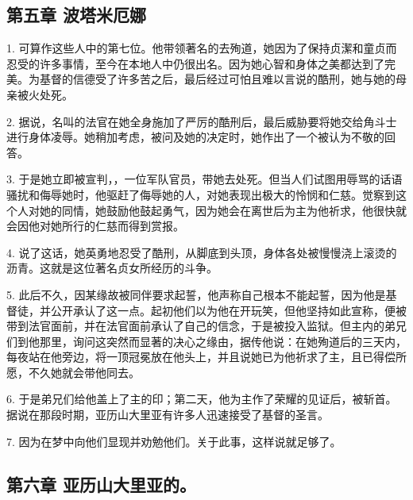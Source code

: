 
\subsection{第五章 波塔米厄娜}

1. 可算作这些人中的第七位。他带领著名的去殉道，她因为了保持贞潔和童贞而忍受的许多事情，至今在本地人中仍很出名。因为她心智和身体之美都达到了完美。为基督的信德受了许多苦之后，最后经过可怕且难以言说的酷刑，她与她的母亲被火处死。\par

2. 据说，名叫的法官在她全身施加了严厉的酷刑后，最后威胁要将她交给角斗士进行身体凌辱。她稍加考虑，被问及她的决定时，她作出了一个被认为不敬的回答。\par

3. 于是她立即被宣判，，一位军队官员，带她去处死。但当人们试图用辱骂的话语骚扰和侮辱她时，他驱赶了侮辱她的人，对她表现出极大的怜悯和仁慈。觉察到这个人对她的同情，她鼓励他鼓起勇气，因为她会在离世后为主为他祈求，他很快就会因他对她所行的仁慈而得到赏报。\par

4. 说了这话，她英勇地忍受了酷刑，从脚底到头顶，身体各处被慢慢浇上滚烫的沥青。这就是这位著名贞女所经历的斗争。\par

5. 此后不久，因某缘故被同伴要求起誓，他声称自己根本不能起誓，因为他是基督徒，并公开承认了这一点。起初他们以为他在开玩笑，但他坚持如此宣称，便被带到法官面前，并在法官面前承认了自己的信念，于是被投入监狱。但主内的弟兄们到他那里，询问这突然而显著的决心之缘由，据传他说：在她殉道后的三天内，每夜站在他旁边，将一顶冠冕放在他头上，并且说她已为他祈求了主，且已得偿所愿，不久她就会带他同去。\par

6. 于是弟兄们给他盖上了主的印；第二天，他为主作了荣耀的见证后，被斩首。据说在那段时期，亚历山大里亚有许多人迅速接受了基督的圣言。\par

7. 因为在梦中向他们显现并劝勉他们。关于此事，这样说就足够了。\par


\subsection{第六章 亚历山大里亚的。}

